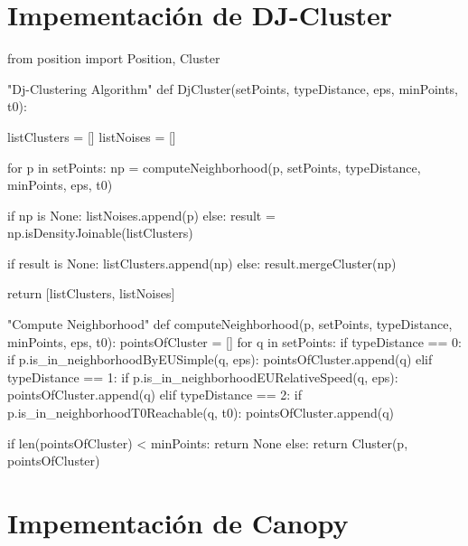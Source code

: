 \documentclass[a4paper, 12pt]{article}
\begin{document}
\newpage
\section{Impementaci\'on de DJ-Cluster} \label{App:AppendixC}

\begin{python}
from position import Position, Cluster

"Dj-Clustering Algorithm"
def DjCluster(setPoints, typeDistance, eps, minPoints, t0):

	listClusters = []
	listNoises = []

	for p in setPoints:
		np = computeNeighborhood(p, setPoints, typeDistance, minPoints, eps, t0)

		if np is None:
			listNoises.append(p) 
		else:
			result = np.isDensityJoinable(listClusters)

			if result is None:
				listClusters.append(np) 
			else:
				result.mergeCluster(np)

	return [listClusters, listNoises]

"Compute Neighborhood"
def computeNeighborhood(p, setPoints, typeDistance, minPoints, eps, t0):
	pointsOfCluster = []
	for q in setPoints:
		if typeDistance == 0:
			if p.is_in_neighborhoodByEUSimple(q, eps):
				pointsOfCluster.append(q)
		elif typeDistance == 1:
			if p.is_in_neighborhoodEURelativeSpeed(q, eps):
				pointsOfCluster.append(q)
		elif typeDistance == 2:
			if p.is_in_neighborhoodT0Reachable(q, t0):
				pointsOfCluster.append(q)

	if len(pointsOfCluster) < minPoints:
		return None
	else:
		return Cluster(p, pointsOfCluster)			

\end{python}

\newpage
\section{Impementaci\'on de Canopy} \label{App:AppendixD}
\end{document}
